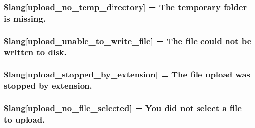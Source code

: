 \subsubsection[{\$lang}]{\setlength{\rightskip}{0pt plus 5cm}\$lang\mbox{[}\textquotesingle{}upload\+\_\+no\+\_\+temp\+\_\+directory\textquotesingle{}\mbox{]} = \textquotesingle{}The temporary folder is missing.\textquotesingle{}}\label{upload__lang_8php_ac7144f4992346816875bac28488ef715}
\hypertarget{upload__lang_8php_a620b622468d4e7781fed6316440c85e7}{}
\subsubsection[{\$lang}]{\setlength{\rightskip}{0pt plus 5cm}\$lang\mbox{[}\textquotesingle{}upload\+\_\+unable\+\_\+to\+\_\+write\+\_\+file\textquotesingle{}\mbox{]} = \textquotesingle{}The file could not be written to disk.\textquotesingle{}}\label{upload__lang_8php_a620b622468d4e7781fed6316440c85e7}
\hypertarget{upload__lang_8php_ae97257deea3dddb33be4bbc6510a464b}{}
\subsubsection[{\$lang}]{\setlength{\rightskip}{0pt plus 5cm}\$lang\mbox{[}\textquotesingle{}upload\+\_\+stopped\+\_\+by\+\_\+extension\textquotesingle{}\mbox{]} = \textquotesingle{}The file upload was stopped by extension.\textquotesingle{}}\label{upload__lang_8php_ae97257deea3dddb33be4bbc6510a464b}
\hypertarget{upload__lang_8php_a88d8e8f9b879d1c25e6c089f3d3b5a30}{}
\subsubsection[{\$lang}]{\setlength{\rightskip}{0pt plus 5cm}\$lang\mbox{[}\textquotesingle{}upload\+\_\+no\+\_\+file\+\_\+selected\textquotesingle{}\mbox{]} = \textquotesingle{}You did not select {\bf a} file to upload.\textquotesingle{}}\label{upload__lang_8php_a88d8e8f9b879d1c25e6c089f3d3b5a30}
\hypertarget{upload__lang_8php_ac8631aa85ed80396bd78e91a76d5fd38}{}
